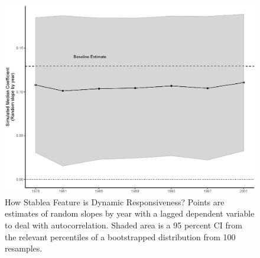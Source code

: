 \documentclass[a4paper,12pt]{article}
\begin{document}
\begin{figure}[!htb]
	\centering
	\includegraphics[scale = .65]{StabilityOfEffects.eps}
	\caption{How Stablea Feature is Dynamic Responsiveness? Points are estimates of random slopes by year with a lagged dependent variable to deal with autocorrelation. Shaded area is a 95 percent CI from the relevant percentiles of a bootstrapped distribution from 100 resamples.} \label{fig:stab}
\end{figure}



\end{document}

